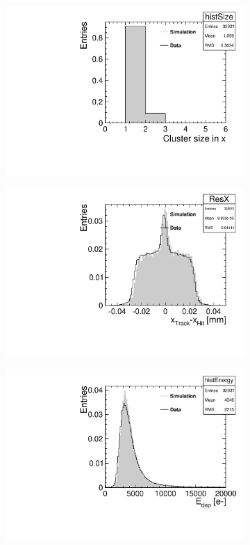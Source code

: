 \begin{figure}[htbp] \centering
  \begin{subfigure}[b]{0.3\textwidth}
    \includegraphics[width=\textwidth]{figures/TestBeam/50micron_sizeX.pdf}
    \caption{}
  \end{subfigure} \hfill
  \begin{subfigure}[b]{0.3\textwidth}
    \includegraphics[width=\textwidth]{figures/TestBeam/50micron_resX.pdf}
    \caption{}
  \end{subfigure} \hfill
  \begin{subfigure}[b]{0.3\textwidth}
    \includegraphics[width=\textwidth]{figures/TestBeam/50micron_Edep.pdf}

\end{subfigure}
\end{figure}
